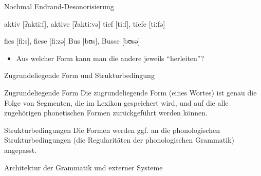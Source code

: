 \begin{frame}
  {Nochmal Endrand-Desonorisierung}
  \pause
  \begin{exe}
    \ex
    \begin{xlist}
    \end{xlist}
    \ex
    \begin{xlist}
    \end{xlist}
    \ex
    \begin{xlist}
    \end{xlist}
    \ex
    \begin{xlist}
      \ex aktiv [ʔaktiːf], aktive [ʔaktiːvə]
      \ex tief [tiːf], tiefe [tiːfə]
    \end{xlist}
    \ex
    \begin{xlist}
      \ex fies [fiːs], fiese [fiːzə]
      \ex Bus [bʊs], Busse [bʊsə]
    \end{xlist}
  \end{exe}
  \pause
  \Zeile
  \begin{itemize}
    \item \alert{Aus welcher Form kann man die andere jeweils "`herleiten"'?}
  \end{itemize}
\end{frame}


\begin{frame}
  {Zugrundeliegende Form und Strukturbedingung}
  \pause
  \Large
  \begin{block}{Zugrundeliegende Form}    
    Die zugrundeliegende Form (eines Wortes) ist genau die Folge von Segmenten, die im Lexikon gespeichert wird, und auf die alle zugehörigen phonetischen Formen zurückgeführt werden können.
  \end{block}
  \pause
  \Zeile
  \begin{block}{Strukturbedingungen}
    Die Formen werden ggf. an die phonologischen Strukturbedingungen (die Regularitäten der phonologischen Grammatik) angepasst.    
  \end{block}
\end{frame}

\begin{frame}
  {Architektur der Grammatik und externer Systeme}
  \pause
  \centering
\end{frame}

